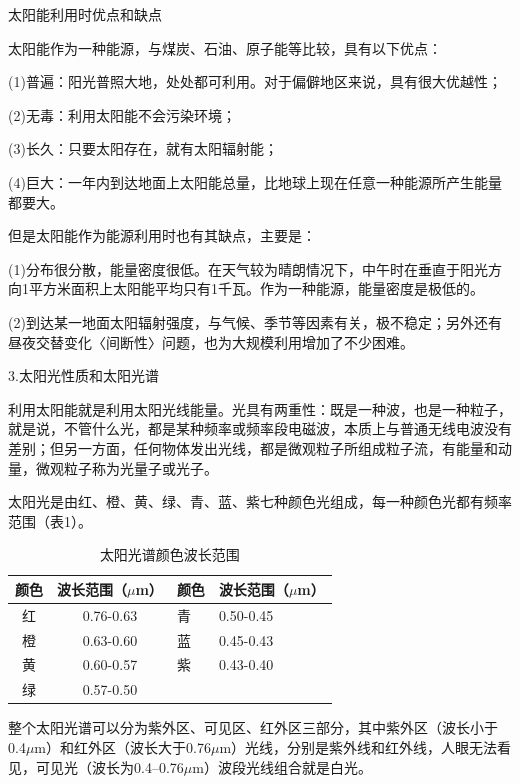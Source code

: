 \documentclass{ctexbook}
\begin{document}
太阳能利用时优点和缺点

太阳能作为一种能源，与煤炭、石油、原子能等比较，具有以下优点：

(1)普遍：阳光普照大地，处处都可利用。对于偏僻地区来说，具有很大优越性；

(2)无毒：利用太阳能不会污染环境；

(3)长久：只要太阳存在，就有太阳辐射能；

(4)巨大：一年内到达地面上太阳能总量，比地球上现在任意一种能源所产生能量都要大。

但是太阳能作为能源利用时也有其缺点，主要是：

(1)分布很分散，能量密度很低。在天气较为晴朗情况下，中午时在垂直于阳光方向1平方米面积上太阳能平均只有1千瓦。作为一种能源，能量密度是极低的。

(2)到达某一地面太阳辐射强度，与气候、季节等因素有关，极不稳定；另外还有昼夜交替变化〈间断性〉问题，也为大规模利用增加了不少困难。

3.太阳光性质和太阳光谱

利用太阳能就是利用太阳光线能量。光具有两重性：既是一种波，也是一种粒子，就是说，不管什么光，都是某种频率或频率段电磁波，本质上与普通无线电波没有差别；但另一方面，任何物体发出光线，都是微观粒子所组成粒子流，有能量和动量，微观粒子称为光量子或光子。

太阳光是由红、橙、黄、绿、青、蓝、紫七种颜色光组成，每一种颜色光都有频率范围（表1）。
\begin{table}[htbp]
	\centering
	\caption{太阳光谱颜色波长范围}
	\begin{tabular}{c|c|c|c}
		\hline
		颜色    & 波长范围（$\mu$m） & \multicolumn{1}{l}{颜色} & \multicolumn{1}{l}{波长范围（$\mu$m）} \\ \hline
		红     & 0.76-0.63 & \multicolumn{1}{l}{青} & \multicolumn{1}{l}{0.50-0.45} \\ \hline
		橙     & 0.63-0.60 & \multicolumn{1}{l}{蓝} & \multicolumn{1}{l}{0.45-0.43} \\ \hline
		黄     & 0.60-0.57 & \multicolumn{1}{l}{紫} & \multicolumn{1}{l}{0.43-0.40} \\ \hline
		绿     & 0.57-0.50 &       &  \\
		\hline
	\end{tabular}%
	\label{tab:bochang}%
\end{table}%

整个太阳光谱可以分为紫外区、可见区、红外区三部分，其中紫外区（波长小于0.4$\mu$m）和红外区（波长大于0.76$\mu$m）光线，分别是紫外线和红外线，人眼无法看见，可见光（波长为0.4--0.76$\mu$m）波段光线组合就是白光。
\end{document}

